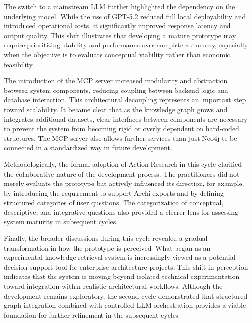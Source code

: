 The switch to a mainstream LLM further highlighted the dependency on the underlying model. While the use of GPT-5.2 reduced full local deployability and introduced operational costs, it significantly improved response latency and output quality. This shift illustrates that developing a mature prototype may require prioritizing stability and performance over complete autonomy, especially when the objective is to evaluate conceptual viability rather than economic feasibility.

The introduction of the MCP server increased modularity and abstraction between system components, reducing coupling between backend logic and database interaction. This architectural decoupling represents an important step toward scalability. It became clear that as the knowledge graph grows and integrates additional datasets, clear interfaces between components are necessary to prevent the system from becoming rigid or overly dependent on hard-coded structures. The MCP server also allows further services than just Neo4j to be connected in a standardized way in future development.

Methodologically, the formal adoption of Action Research in this cycle clarified the collaborative nature of the development process. The practitioners did not merely evaluate the prototype but actively influenced its direction, for example, by introducing the requirement to support Archi exports and by defining structured categories of user questions. The categorization of conceptual, descriptive, and integrative questions also provided a clearer lens for assessing system maturity in subsequent cycles.

Finally, the broader discussions during this cycle revealed a gradual transformation in how the prototype is perceived. What began as an experimental knowledge-retrieval system is increasingly viewed as a potential decision-support tool for enterprise architecture projects. This shift in perception indicates that the system is moving beyond isolated technical experimentation toward integration within realistic architectural workflows. Although the development remains exploratory, the second cycle demonstrated that structured graph integration combined with controlled LLM orchestration provides a viable foundation for further refinement in the subsequent cycles.
